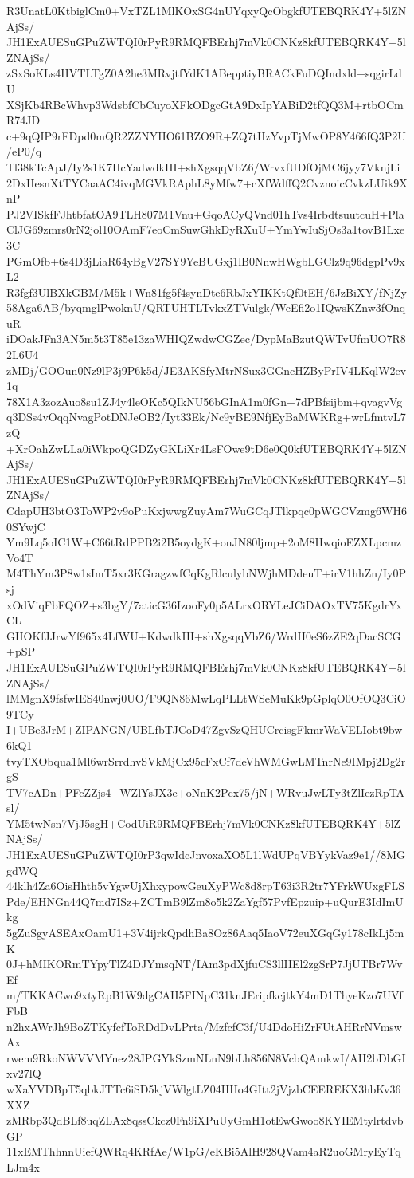 R3UnatL0KtbiglCm0+VxTZL1MlKOxSG4nUYqxyQcObgkfUTEBQRK4Y+5lZNAjSs/
JH1ExAUESuGPuZWTQI0rPyR9RMQFBErhj7mVk0CNKz8kfUTEBQRK4Y+5lZNAjSs/
zSxSoKLs4HVTLTgZ0A2he3MRvjtfYdK1ABepptiyBRACkFuDQIndxld+sqgirLdU
XSjKb4RBcWhvp3WdsbfCbCuyoXFkODgcGtA9DxIpYABiD2tfQQ3M+rtbOCmR74JD
c+9qQIP9rFDpd0mQR2ZZNYHO61BZO9R+ZQ7tHzYvpTjMwOP8Y466fQ3P2U/eP0/q
Tl38kTcApJ/Iy2s1K7HcYadwdkHI+shXgsqqVbZ6/WrvxfUDfOjMC6jyy7VknjLi
2DxHesnXtTYCaaAC4ivqMGVkRAphL8yMfw7+cXfWdffQ2CvznoicCvkzLUik9XnP
PJ2VISkfFJhtbfatOA9TLH807M1Vnu+GqoACyQVnd01hTvs4IrbdtsuutcuH+Pla
ClJG69zmrs0rN2jol10OAmF7eoCmSuwGhkDyRXuU+YmYwIuSjOs3a1tovB1Lxe3C
PGmOfb+6s4D3jLiaR64yBgV27SY9YeBUGxj1lB0NnwHWgbLGClz9q96dgpPv9xL2
R3fgf3UlBXkGBM/M5k+Wn81fg5f4synDte6RbJxYIKKtQf0tEH/6JzBiXY/fNjZy
58Aga6AB/byqmglPwoknU/QRTUHTLTvkxZTVulgk/WcEfi2o1IQwsKZnw3fOnquR
iDOakJFn3AN5m5t3T85e13zaWHIQZwdwCGZec/DypMaBzutQWTvUfmUO7R82L6U4
zMDj/GOOun0Nz9lP3j9P6k5d/JE3AKSfyMtrNSux3GGncHZByPrIV4LKqlW2ev1q
78X1A3zozAuo8su1ZJ4y4leOKc5QIkNU56bGInA1m0fGn+7dPBfsijbm+qvagvVg
q3DSs4vOqqNvagPotDNJeOB2/Iyt33Ek/Nc9yBE9NfjEyBaMWKRg+wrLfmtvL7zQ
+XrOahZwLLa0iWkpoQGDZyGKLiXr4LsFOwe9tD6e0Q0kfUTEBQRK4Y+5lZNAjSs/
JH1ExAUESuGPuZWTQI0rPyR9RMQFBErhj7mVk0CNKz8kfUTEBQRK4Y+5lZNAjSs/
CdapUH3btO3ToWP2v9oPuKxjwwgZuyAm7WuGCqJTlkpqc0pWGCVzmg6WH60SYwjC
Ym9Lq5oIC1W+C66tRdPPB2i2B5oydgK+onJN80ljmp+2oM8HwqioEZXLpcmzVo4T
M4ThYm3P8w1sImT5xr3KGragzwfCqKgRlculybNWjhMDdeuT+irV1hhZn/Iy0Psj
xOdViqFbFQOZ+s3bgY/7aticG36IzooFy0p5ALrxORYLeJCiDAOxTV75KgdrYxCL
GHOKfJJrwYf965x4LfWU+KdwdkHI+shXgsqqVbZ6/WrdH0eS6zZE2qDacSCG+pSP
JH1ExAUESuGPuZWTQI0rPyR9RMQFBErhj7mVk0CNKz8kfUTEBQRK4Y+5lZNAjSs/
lMMgnX9fsfwIES40nwj0UO/F9QN86MwLqPLLtWSeMuKk9pGplqO0OfOQ3CiO9TCy
I+UBe3JrM+ZIPANGN/UBLfbTJCoD47ZgvSzQHUCrcisgFkmrWaVELIobt9bw6kQ1
tvyTXObqua1Ml6wrSrrdhvSVkMjCx95cFxCf7deVhWMGwLMTnrNe9IMpj2Dg2rgS
TV7cADn+PFcZZjs4+WZlYsJX3e+oNnK2Pcx75/jN+WRvuJwLTy3tZlIezRpTAsl/
YM5twNsn7VjJ5sgH+CodUiR9RMQFBErhj7mVk0CNKz8kfUTEBQRK4Y+5lZNAjSs/
JH1ExAUESuGPuZWTQI0rP3qwIdcJnvoxaXO5L1lWdUPqVBYykVaz9e1//8MGgdWQ
44klh4Za6OisHhth5vYgwUjXhxypowGeuXyPWc8d8rpT63i3R2tr7YFrkWUxgFLS
Pde/EHNGn44Q7md7ISz+ZCTmB9lZm8o5k2ZaYgf57PvfEpzuip+uQurE3IdImUkg
5gZuSgyASEAxOamU1+3V4ijrkQpdhBa8Oz86Aaq5IaoV72euXGqGy178cIkLj5mK
0J+hMIKORmTYpyTlZ4DJYmsqNT/IAm3pdXjfuCS3llIIEl2zgSrP7JjUTBr7WvEf
m/TKKACwo9xtyRpB1W9dgCAH5FINpC31knJEripfkcjtkY4mD1ThyeKzo7UVfFbB
n2hxAWrJh9BoZTKyfcfToRDdDvLPrta/MzfcfC3f/U4DdoHiZrFUtAHRrNVmswAx
rwem9RkoNWVVMYnez28JPGYkSzmNLnN9bLh856N8VcbQAmkwI/AH2bDbGIxv27lQ
wXaYVDBpT5qbkJTTc6iSD5kjVWlgtLZ04HHo4GItt2jVjzbCEEREKX3hbKv36XXZ
zMRbp3QdBLf8uqZLAx8qssCkcz0Fn9iXPuUyGmH1otEwGwoo8KYIEMtylrtdvbGP
11xEMThhnnUiefQWRq4KRfAe/W1pG/eKBi5AlH928QVam4aR2uoGMryEyTqLJm4x
